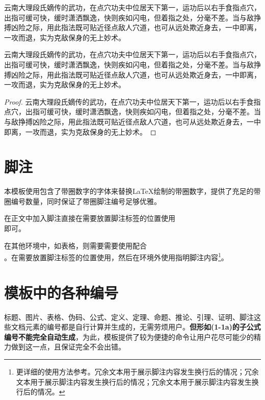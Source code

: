 \documentclass[print, promaster, vlined]{DissertUESTC}
\begin{document}
	\begin{corollary}
		云南大理段氏嫡传的武功，在点穴功夫中位居天下第一，运功后以右手食指点穴，出指可缓可快，缓时潇洒飘逸，快则疾如闪电，但着指之处，分毫不差。当与敌挣搏凶险之际，用此指法既可贴近径点敌人穴道，也可从远处欺近身去，一中即离，一攻而退，实为克敌保身的无上妙术。
	\end{corollary}
	
	\begin{lemma}
		云南大理段氏嫡传的武功，在点穴功夫中位居天下第一，运功后以右手食指点穴，出指可缓可快，缓时潇洒飘逸，快则疾如闪电，但着指之处，分毫不差。当与敌挣搏凶险之际，用此指法既可贴近径点敌人穴道，也可从远处欺近身去，一中即离，一攻而退，实为克敌保身的无上妙术。
	\end{lemma}
	
	\begin{proof}
		云南大理段氏嫡传的武功，在点穴功夫中位居天下第一，运功后以右手食指点穴，出指可缓可快，缓时潇洒飘逸，快则疾如闪电，但着指之处，分毫不差。当与敌挣搏凶险之际，用此指法既可贴近径点敌人穴道，也可从远处欺近身去，一中即离，一攻而退，实为克敌保身的无上妙术。
	\end{proof}
	
	
	\section{脚注}
	
	本模板使用包含了带圈数字的字体来替换LaTeX绘制的带圈数字，提供了充足的带圈编号数量，同时保证了带圈脚注编号足够优雅。
	
	在正文中加入脚注直接在需要放置脚注标签的位置使用\\即可。
	
	在其他环境中，如表格，则需要需要使用配合\\。在需要放置脚注标签的位置使用，然后在环境外使用指明脚注内容\footnote{更详细的使用方法参考\href{https://blog.csdn.net/xovee/article/details/127563209}{}。冗余文本用于展示脚注内容发生换行后的情况；冗余文本用于展示脚注内容发生换行后的情况；冗余文本用于展示脚注内容发生换行后的情况。}。
	
	
	\section{模板中的各种编号}
	
	标题、图片、表格、伪码、公式、定义、定理、命题、推论、引理、证明、脚注这些文档元素的编号都是自行计算并生成的，无需劳烦用户。\textbf{但形如(1-1a)的子公式编号不能完全自动生成}，为此，模板提供了较为便捷的命令让用户花尽可能少的精力做到这一点，且保证完全不会出错。
	
\end{document}
